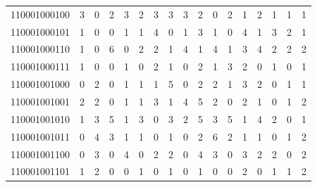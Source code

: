 \documentclass[10pt,a4paper]{article}
\begin{document}
\begin{longtable}{ |c|c|c|c|c|c|c|c|c|c|c|c|c|c|c|c|c| }
    110001000100              & 3                            & 0                                & 2                            & 3                              & 2   & 3   & 3   & 3   & 2   & 0   & 2   & 1   & 2   & 1   & 1   & 1   \\
    110001000101              & 1                            & 0                                & 0                            & 1                              & 1   & 4   & 0   & 1   & 3   & 1   & 0   & 4   & 1   & 3   & 2   & 1   \\
    110001000110              & 1                            & 0                                & 6                            & 0                              & 2   & 2   & 1   & 4   & 1   & 4   & 1   & 3   & 4   & 2   & 2   & 2   \\
    110001000111              & 1                            & 0                                & 0                            & 1                              & 0   & 2   & 1   & 0   & 2   & 1   & 3   & 2   & 0   & 1   & 0   & 1   \\
    110001001000              & 0                            & 2                                & 0                            & 1                              & 1   & 1   & 5   & 0   & 2   & 2   & 1   & 3   & 2   & 0   & 1   & 1   \\
    110001001001              & 2                            & 2                                & 0                            & 1                              & 1   & 3   & 1   & 4   & 5   & 2   & 0   & 2   & 1   & 0   & 1   & 2   \\
    110001001010              & 1                            & 3                                & 5                            & 1                              & 3   & 0   & 3   & 2   & 5   & 3   & 5   & 1   & 4   & 2   & 0   & 1   \\
    110001001011              & 0                            & 4                                & 3                            & 1                              & 1   & 0   & 1   & 0   & 2   & 6   & 2   & 1   & 1   & 0   & 1   & 2   \\
    110001001100              & 0                            & 3                                & 0                            & 4                              & 0   & 2   & 2   & 0   & 4   & 3   & 0   & 3   & 2   & 2   & 0   & 2   \\
    110001001101              & 1                            & 2                                & 0                            & 0                              & 1   & 0   & 1   & 0   & 1   & 0   & 0   & 2   & 0   & 1   & 1   & 2   \\

\end{longtable}
\end{document}
